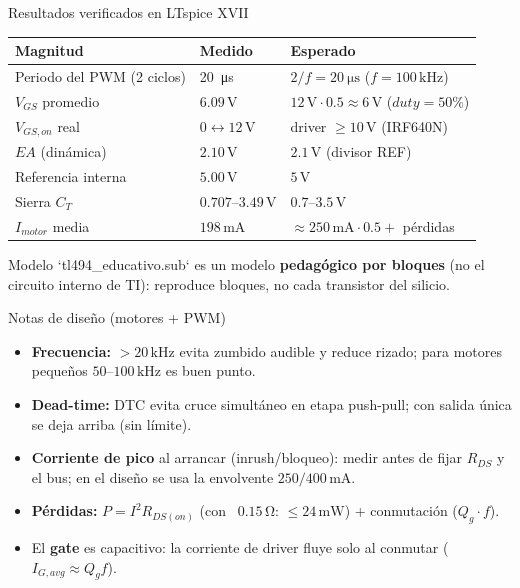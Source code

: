 \documentclass[aspectratio=169]{beamer}
\begin{document}
\begin{frame}{Resultados verificados en LTspice XVII}
  \begin{table}
    \small
    \begin{tabular}{lll}
      \toprule
      Magnitud & Medido & Esperado \\
      \midrule
      Periodo del PWM (2 ciclos) & \SI{20}{\micro\second} & $2/f = \SI{20}{\micro\second}$ ($f=100\,\mathrm{kHz}$) \\
      $V_{GS}$ promedio & $6.09\,\mathrm{V}$ & $12\,\mathrm{V}\cdot 0.5 \approx 6\,\mathrm{V}$ ($duty=50\%$) \\
      $V_{GS,on}$ real & $0\leftrightarrow 12\,\mathrm{V}$ & driver $\ge 10\,\mathrm{V}$ (IRF640N) \\
      $EA$ (dinámica) & $2.10\,\mathrm{V}$ & $2.1\,\mathrm{V}$ (divisor REF) \\
      Referencia interna & $5.00\,\mathrm{V}$ & $5\,\mathrm{V}$ \\
      Sierra $C_T$ & $0.707$–$3.49\,\mathrm{V}$ & $0.7$–$3.5\,\mathrm{V}$ \\
      $I_{motor}$ media & $198\,\mathrm{mA}$ & $\approx 250\,\mathrm{mA}\cdot 0.5 +$ pérdidas \\
      \bottomrule
    \end{tabular}
  \end{table}
  \begin{block}{Modelo}
    `tl494\_educativo.sub` es un modelo \textbf{pedagógico por bloques} (no el
    circuito interno de TI): reproduce bloques, no cada transistor del silicio.
  \end{block}
\end{frame}

\begin{frame}{Notas de diseño (motores + PWM)}
  \begin{itemize}
    \item \textbf{Frecuencia:} $>20\,\mathrm{kHz}$ evita zumbido audible y reduce rizado;
      para motores pequeños $50$–$100\,\mathrm{kHz}$ es buen punto.
    \item \textbf{Dead-time:} DTC evita cruce simultáneo en etapa push-pull;
      con salida única se deja arriba (sin límite).
    \item \textbf{Corriente de pico} al arrancar (inrush/bloqueo): medir antes de
      fijar $R_{DS}$ y el bus; en el diseño se usa la envolvente $250/400\,\mathrm{mA}$.
    \item \textbf{Pérdidas:} $P = I^2 R_{DS(on)}$ (con ~$0.15\,\mathrm{\Omega}$: $\le 24\,\mathrm{mW}$)
      + conmutación ($Q_g\cdot f$).
    \item El \textbf{gate} es capacitivo: la corriente de driver fluye solo al
      conmutar ($I_{G,avg} \approx Q_g f$).
  \end{itemize}
\end{frame}
\end{document}
